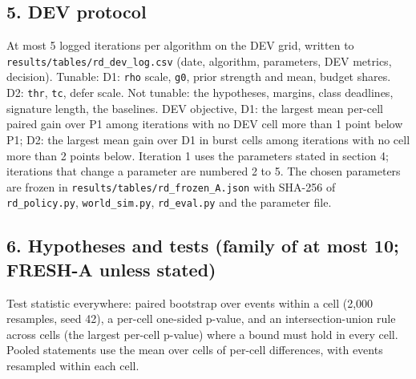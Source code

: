 \begin{itemize}
\end{itemize}

\subsection*{5. DEV protocol}
At most 5 logged iterations per algorithm on the DEV grid, written to \texttt{results/tables/rd\_dev\_log.csv} (date, algorithm, parameters, DEV metrics, decision). Tunable: D1: \texttt{rho} scale, \texttt{g0}, prior strength and mean, budget shares. D2: \texttt{thr}, \texttt{tc}, defer scale. Not tunable: the hypotheses, margins, class deadlines, signature length, the baselines. DEV objective, D1: the largest mean per-cell paired gain over P1 among iterations with no DEV cell more than 1 point below P1; D2: the largest mean gain over D1 in burst cells among iterations with no cell more than 2 points below. Iteration 1 uses the parameters stated in section 4; iterations that change a parameter are numbered 2 to 5. The chosen parameters are frozen in \texttt{results/tables/rd\_frozen\_A.json} with SHA-256 of \texttt{rd\_policy.py}, \texttt{world\_sim.py}, \texttt{rd\_eval.py} and the parameter file.

\subsection*{6. Hypotheses and tests (family of at most 10; FRESH-A unless stated)}
Test statistic everywhere: paired bootstrap over events within a cell (2,000 resamples, seed 42), a per-cell one-sided p-value, and an intersection-union rule across cells (the largest per-cell p-value) where a bound must hold in every cell. Pooled statements use the mean over cells of per-cell differences, with events resampled within each cell.

